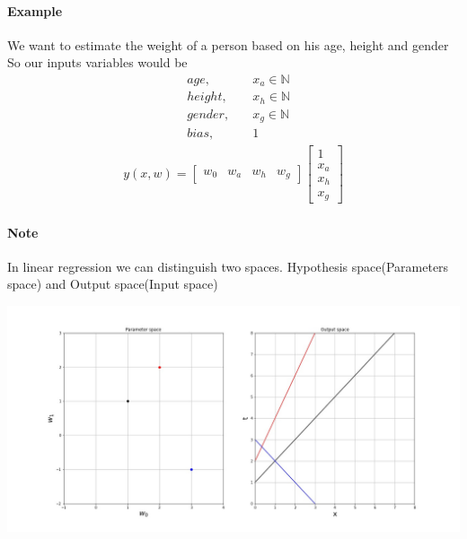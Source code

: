 \documentclass[../main.tex]{subfiles}
\begin{document}
\paragraph{Example} We want to estimate the weight of a person based on his age, height and gender
So our inputs variables would be
\begin{align*}
     & age,\quad     & x_a\in \mathbb{N} \\
     & height,\quad  & x_h\in \mathbb{N} \\
     & gender, \quad & x_g\in \mathbb{N} \\
     & bias, \quad   & 1
\end{align*}
\begin{align*}
    y(x,w)=
    \begin{bmatrix}w_0 & w_a & w_h & w_g\end{bmatrix}
    \begin{bmatrix}1\\ x_a \\ x_h \\x_g\end{bmatrix}
\end{align*}

\paragraph{Note} In linear regression we can distinguish two spaces. Hypothesis space(Parameters space) and Output space(Input space)

\begin{center}
    \includegraphics[scale=0.4]{images/param_input_space.jpg}
\end{center}
\end{document}

